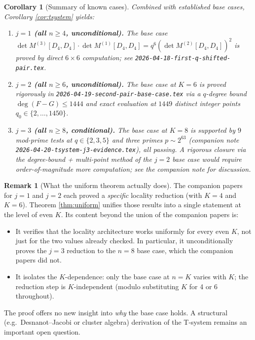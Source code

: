\documentclass[11pt]{article}
\newtheorem{corollary}[theorem]{Corollary}
\theoremstyle{definition}
\newtheorem{remark}[theorem]{Remark}
\begin{document}
\begin{corollary}[Summary of known cases]\label{cor:summary}
Combined with established base cases, Corollary \ref{cor:tsystem} yields:
\begin{enumerate}
\item \textbf{$j = 1$ (all $n \geq 4$, unconditional).}  The base case $\det M^{(3)}[D_4, D_4] \cdot \det M^{(1)}[D_4, D_4] = q^{6}(\det M^{(2)}[D_4, D_4])^2$ is proved by direct $6 \times 6$ computation; see \texttt{2026-04-18-first-q-shifted-pair.tex}.

\item \textbf{$j = 2$ (all $n \geq 6$, unconditional).}  The base case at $K = 6$ is proved rigorously in \texttt{2026-04-19-second-pair-base-case.tex} via a $q$-degree bound $\deg(F-G) \leq 1444$ and exact evaluation at $1449$ distinct integer points $q_0 \in \{2, \ldots, 1450\}$.

\item \textbf{$j = 3$ (all $n \geq 8$, conditional).}  The base case at $K = 8$ is supported by $9$ mod-prime tests at $q \in \{2, 3, 5\}$ and three primes $p \sim 2^{63}$ (companion note \texttt{2026-04-20-tsystem-j3-evidence.tex}), all passing.  A rigorous closure via the degree-bound + multi-point method of the $j=2$ base case would require order-of-magnitude more computation; see the companion note for discussion.
\end{enumerate}
\end{corollary}

\begin{remark}[What the uniform theorem actually does]
The companion papers for $j=1$ and $j=2$ each proved a \emph{specific} locality reduction (with $K = 4$ and $K = 6$).  Theorem \ref{thm:uniform} unifies those results into a single statement at the level of even $K$.  Its content beyond the union of the companion papers is:
\begin{itemize}
\item It verifies that the locality architecture works uniformly for every even $K$, not just for the two values already checked.  In particular, it unconditionally proves the $j=3$ reduction to the $n=8$ base case, which the companion papers did not.
\item It isolates the $K$-dependence: only the base case at $n = K$ varies with $K$; the reduction step is $K$-independent (modulo substituting $K$ for 4 or 6 throughout).
\end{itemize}
The proof offers no new insight into \emph{why} the base case holds.  A structural (e.g.\ Desnanot--Jacobi or cluster algebra) derivation of the T-system remains an important open question.
\end{remark}
\end{document}
